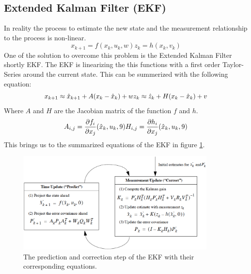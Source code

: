 \subsection*{Extended Kalman Filter (EKF)}\label{ekf}
In reality the process to estimate the new state and the measurement relationship to the process is non-linear.
\begin{equation}
x_{k+1}=f(x_k,u_k,w)
z_k=h(x_k,v_k)
\end{equation}
One of the solution to overcome this problem is the Extended Kalman Filter shortly EKF. The EKF is linearizing the this functions with a first order Taylor-Series around the current state. This can be summerized with the following equation:
\begin{equation}
x_{k+1}\approx \hat{x}_{k+1}+A(x_k-\hat{x}_k)+w\\
z_k\approx \hat{z}_k+H(x_k-\hat{x}_k) +v 
\end{equation}
Where $A$ and $H$ are the Jacobian matrix of the function $f$ and $h$.
\begin{equation}
A_{i,j}=\frac{\partial f_{i}}{\partial x_j}(\hat{x}_k,u_k,9)\\
H_{i,j}=\frac{\partial h_{i}}{\partial x_j}(\hat{x}_k,u_k,9)
\end{equation}
This brings us to the summarized equations of the EKF in figure \ref{equation_ekf}.
\begin{figure}[h]
\begin{center}
\includegraphics[width=10cm]{pictures/equation_ekf.eps}
\caption{The prediction and correction step of the EKF with their corresponding equations. }
\label{equation_ekf}
\end{center}
\end{figure}
